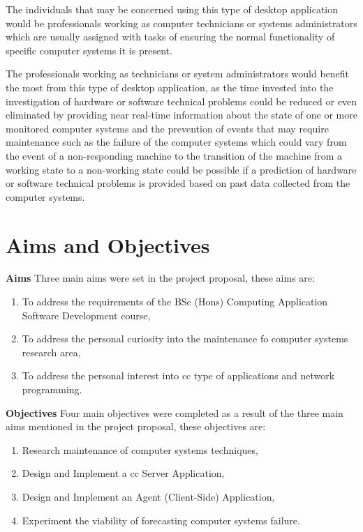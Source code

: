 The individuals that may be concerned using this type of desktop application would be
professionals working as computer technicians or systems administrators which are usually
assigned with tasks of ensuring the normal functionality of specific computer systems it is
present. \par
The professionals working as technicians or system administrators would benefit the
most from this type of desktop application, as the time invested into the investigation of
hardware or software technical problems could be reduced or even eliminated by providing
near real-time information about the state of one or more monitored computer systems and the
prevention of events that may require maintenance such as the failure of the computer systems
which could vary from the event of a non-responding machine to the transition of the machine
from a working state to a non-working state could be possible if a prediction of hardware or
software technical problems is provided based on past data collected from the computer
systems.

\section{Aims and Objectives}

\noindent
\textbf{Aims}
\newline
\newline
Three main aims were set in the project proposal, these aims are:

\begin{enumerate}
    \item To address the requirements of the BSc (Hons) Computing Application Software Development course,
    \item To address the personal curiosity into the maintenance fo computer systems research area,
    \item To address the personal interest into \acrfull{cc} type of applications and network programming.
\end{enumerate}

\noindent
\textbf{Objectives}
\newline
\newline
Four main objectives were completed as a result of the three main aims mentioned
in the project proposal, these objectives are:

\begin{enumerate}
    \item Research maintenance of computer systems techniques,
    \item Design and Implement a \acrfull{cc} Server Application,
    \item Design and Implement an Agent (Client-Side) Application,
    \item Experiment the viability of forecasting computer systems failure.
\end{enumerate}


